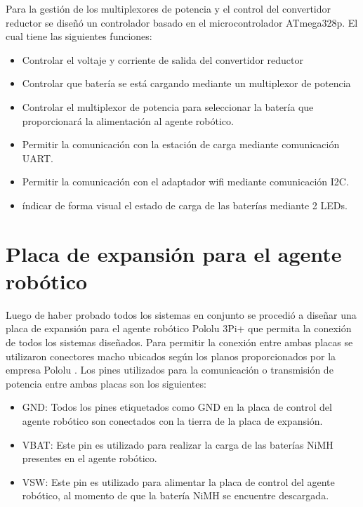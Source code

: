     Para la gestión de los multiplexores de potencia y el control del convertidor
    reductor se diseñó un controlador basado en el microcontrolador ATmega328p.
    El cual tiene las siguientes funciones:

    \begin{itemize}
        \item Controlar el voltaje y corriente de salida del convertidor reductor
        \item Controlar que batería se está cargando mediante un multiplexor de potencia
        \item Controlar el multiplexor de potencia para seleccionar la batería
        que proporcionará la alimentación al agente robótico.
        \item Permitir la comunicación con la estación de carga mediante comunicación
        UART.
        \item  Permitir la comunicación con el adaptador wifi mediante comunicación
        I2C.
        \item índicar de forma visual el estado de carga de las baterías mediante
        2 LEDs.
    \end{itemize}


    \section{Placa de expansión para el agente robótico}

        Luego de haber probado todos los sistemas en conjunto se procedió a diseñar
        una placa de expansión para el agente robótico Pololu 3Pi+ que permita
        la conexión de todos los sistemas diseñados. Para permitir la conexión
         entre ambas placas se utilizaron conectores 
        macho ubicados según los planos proporcionados por la 
        empresa Pololu \cite{noauthor_pololu_nodate}.
        Los pines utilizados para la comunicación o transmisión de potencia entre
        ambas placas son los siguientes:

        \begin{itemize}
            \item GND: Todos los pines etiquetados como GND en la placa de control
            del agente robótico son conectados con la tierra de la placa de expansión.
            \item VBAT: Este pin es utilizado para realizar la carga de las baterías
            NiMH presentes en el agente robótico.
            \item VSW: Este pin es utilizado para alimentar la placa de 
            control del agente robótico, al momento de que la batería NiMH 
            se encuentre descargada.

        \end{itemize}

